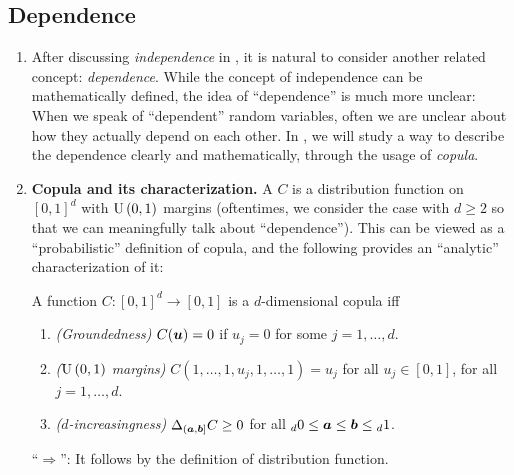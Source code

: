 \subsection{Dependence}
\label{subsect:dependence}
\begin{enumerate}
\item After discussing \emph{independence} in , it
is natural to consider another related concept: \emph{dependence}.  While the
concept of independence can be mathematically defined, the idea of
``dependence'' is much more unclear: When we speak of ``dependent'' random
variables, often we are unclear about how they actually depend on each other.
In , we will study a way to describe the dependence
clearly and mathematically, through the usage of \emph{copula}.
\item \textbf{Copula and its characterization.} A  \(C\) is a distribution function on \([0,1]^{d}\) with \(\operatorname{U}\left(0,1\right)\)
margins (oftentimes, we consider the case with \(d\ge 2\) so that we can
meaningfully talk about ``dependence''). This can be viewed as a
``probabilistic'' definition of copula, and the following provides an
``analytic'' characterization of it:
\begin{proposition}
\label{prp:copula-char}
A function \(C:[0,1]^{d}\to [0,1]\) is a \(d\)-dimensional copula iff
\begin{enumerate}[label={(\arabic*)}]
\item \emph{(Groundedness)} \(C(\bm{u})=0\) if \(u_j=0\) for some \(j=1,\dotsc,d\).
\item \emph{(\(\operatorname{U}\left(0,1\right)\) margins)} \(C(1,\dotsc,1,u_j,1,\dotsc,1)=u_j\) for
all \(u_j\in [0,1]\), for all \(j=1,\dotsc,d\).
\item \emph{(\(d\)-increasingness)} \(\Delta_{(\bm{a},\bm{b}]}C\ge 0\) for
all \({}_{d}0\le\bm{a}\le\bm{b}\le{}_{d}1\).
\end{enumerate}
\end{proposition}
\begin{pf}
``\(\Rightarrow\)'': It follows by the definition of distribution function.


\end{pf}
\end{enumerate}

